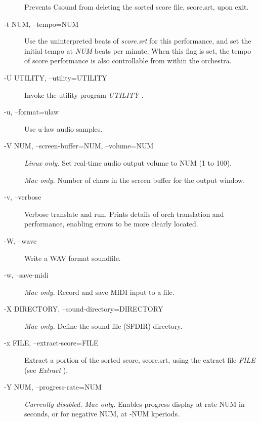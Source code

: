 \begin{description}
  Prevents Csound from deleting the sorted score file, score.srt, upon exit. 

\item[-t NUM, --tempo=NUM]

  Use the uninterpreted beats of \emph{score.srt}
 for this performance, and set the initial tempo at \emph{NUM}
 beats per minute. When this flag is set, the tempo of score performance is also controllable from within the orchestra. 

\item[-U UTILITY, --utility=UTILITY]

  Invoke the utility program \emph{UTILITY}
. 

\item[-u, --format=ulaw]

  Use u-law audio samples. 

\item[-V NUM, --screen-buffer=NUM, --volume=NUM]

 \emph{Linux only.}
 Set real-time audio output volume to NUM (1 to 100). 


 \emph{Mac only.}
 Number of chars in the screen buffer for the output window. 

\item[-v, --verbose]

  Verbose translate and run. Prints details of orch translation and performance, enabling errors to be more clearly located. 

\item[-W, --wave]

  Write a WAV format soundfile. 

\item[-w, --save-midi]

 \emph{Mac only.}
 Record and save MIDI input to a file. 

\item[-X DIRECTORY, --sound-directory=DIRECTORY]

 \emph{Mac only.}
 Define the sound file (SFDIR) directory. 

\item[-x FILE, --extract-score=FILE]

  Extract a portion of the sorted score, score.srt, using the extract file \emph{FILE}
 (see \emph{Extract}
). 

\item[-Y NUM, --progress-rate=NUM]

 \emph{Currently disabled. Mac only.}
 Enables progress display at rate NUM in seconds, or for negative NUM, at -NUM kperiods. 


\end{description}
